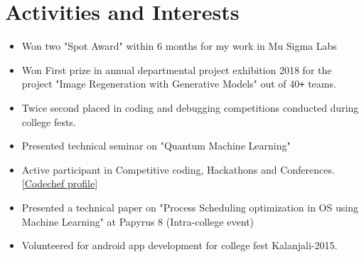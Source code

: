 \documentclass[10pt]{article}
\begin{document}
\section*{Activities and Interests}
\begin{itemize}
 \itemsep0em
 \item Won two "Spot Award" within 6 months for my work in Mu Sigma Labs
 \item 
 Won First prize in annual departmental project exhibition 2018 for the project "Image Regeneration with Generative Models" out of 40\texttt{+} teams.
 \item 
 Twice second placed in coding and debugging competitions conducted during college fests.
 \item
 Presented technical seminar on "Quantum Machine Learning" 
 \item
 Active participant in Competitive coding, Hackathons and Conferences. \hfill\textcolor{grey_darker}{[\underline{\href{https://www.codechef.com/users/raghavadhanya}{Codechef profile}}]}
 \item
 Presented a technical paper on "Process Scheduling optimization in OS using Machine Learning" at Papyrus
 8 (Intra-college event)
 \item
 Volunteered for android app development for college fest Kalanjali-2015.
\end{itemize}
\end{document}
